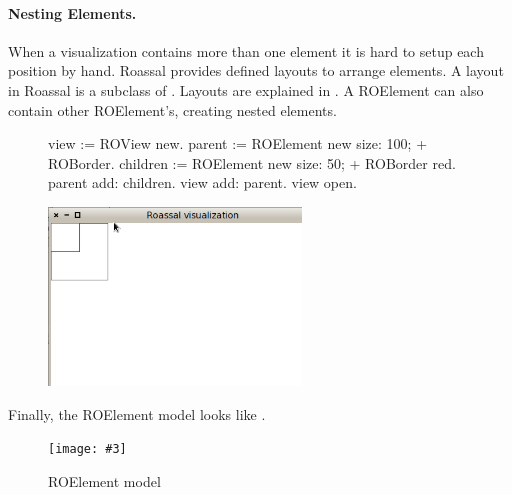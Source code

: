 \documentclass[a4paper,10pt,twoside]{book}
\newcommand{\fig}[4]{
		\begin{figure}[#1]
			\centering
			\texttt{[image: \#3]}
			\caption{\label{fig:#3}#4}
		\end{figure}}
\begin{document}
\paragraph{Nesting Elements.}
When a visualization contains more than one element it is hard to setup each position by hand. Roassal provides defined layouts to arrange elements. A layout in Roassal is a subclass of . Layouts are explained in  .
A ROElement can also contain other ROElement's, creating nested elements.  



\begin{figure}[H]
      \begin{minipage}[t]{0.5\textwidth}
      \vspace{0pt}
\begin{code}{}
view := ROView new.
parent := ROElement new 
				size: 100;
				+ ROBorder.
children := ROElement new 
				size: 50;
				+ ROBorder red.
parent add: children.
view add: parent.
view open.
\end{code}
   \end{minipage}
   \hfill
   \begin{minipage}[t]{0.6\textwidth}
      \vspace{0pt} \raggedright
       \centering
		\includegraphics[width=0.6\textwidth]{ex5}
   \end{minipage}
\label{fig:ex5}
\end{figure}

Finally, the ROElement model looks like .

\fig{H}{0.5}{ROElementModel}{ROElement model}
\end{document}
